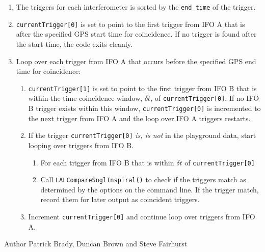 \begin{entry}
\begin{enumerate}
\item The triggers for each interferometer is sorted by the \texttt{end\_time}
of the trigger.

\item \texttt{currentTrigger[0]} is set to point to the first trigger from IFO
A that is after the specified GPS start time for coincidence. If no trigger is
found after the start time, the code exits cleanly.

\item Loop over each trigger from IFO A that occurs before the specified GPS
end time for coincidence:
\begin{enumerate}
\item \texttt{currentTrigger[1]} is set to point to the first trigger from IFO
B that is within the time coincidence window, $\delta t$, of
\texttt{currentTrigger[0]}. If no IFO B trigger exists within this window,
\texttt{currentTrigger[0]} is incremented to the next trigger from IFO A and
the loop over IFO A triggers restarts.

\item If the trigger \texttt{currentTrigger[0]} \emph{is, is not} in the
playground data, start looping over triggers from IFO B.
\begin{enumerate}
\item For each trigger from IFO B that is within $\delta t$ of
\texttt{currentTrigger[0]}
\item Call \texttt{LALCompareSnglInspiral()} to check if the triggers match as
determined by the options on the command line. If the trigger match, record
them for later output as coincident triggers.
\end{enumerate}

\item Increment \texttt{currentTrigger[0]} and continue loop over triggers
from IFO A.
\end{enumerate}
\end{enumerate}

\item[Author] 
Patrick Brady, Duncan Brown and Steve Fairhurst
\end{entry}


